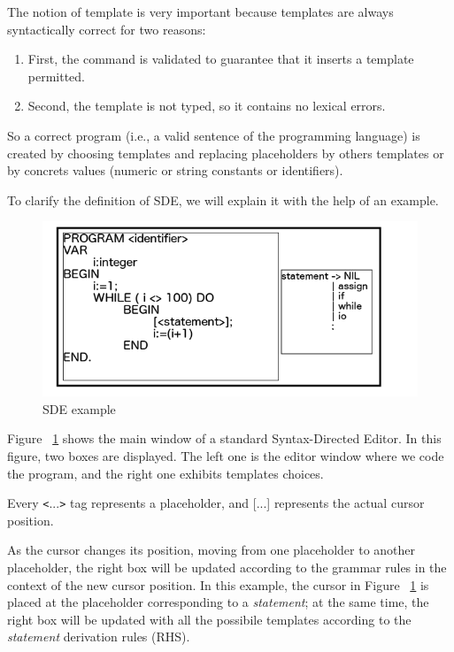 \documentclass[
  oneside,
  11pt, a4paper,
  footinclude=true,
  headinclude=true,
  cleardoublepage=empty
]{scrbook}
\begin{document}
The notion of template is very important because templates are always syntactically correct for two reasons:

\begin{enumerate}
  \item First, the command is validated to guarantee that it inserts a template permitted. %

  \item Second, the template is not typed, so it contains no lexical errors.

\end{enumerate}

So a correct program (i.e., a valid sentence of the programming language) is created by choosing templates and replacing placeholders by others templates or by concrets values (numeric or string constants or identifiers).


To clarify the definition of SDE, we will explain it with the help of an example.

\begin{figure}[h!]
  \centering
    \includegraphics[width=1\textwidth]{img/SDE.png}
    \caption{SDE example}
    \label{fig:SDE}
\end{figure}


Figure ~\ref{fig:SDE} shows the main window of a standard Syntax-Directed Editor.
In this figure, two boxes are displayed.
The left one is the editor window where we code the program, and the right one exhibits templates choices.

Every \texttt{<}...\texttt{>}  tag represents a placeholder, and [...] represents the actual cursor position.

As the cursor changes its position, moving from one placeholder to another placeholder, the right box will be updated according to the grammar rules in the context of the new cursor position.
In this example, the cursor in Figure ~\ref{fig:SDE} is placed at the placeholder corresponding to a \textit{statement}; at the same time, the right box will be updated with all the possibile templates according to the \textit{statement} derivation rules (RHS).
\end{document}
